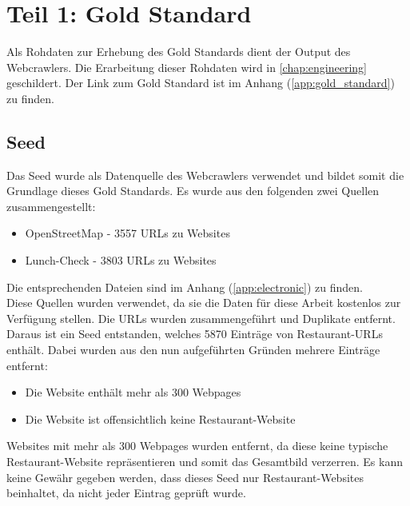 \chapter{Teil 1: Gold Standard}
\label{chap:gold_standard}
Als Rohdaten zur Erhebung des Gold Standards dient der Output des Webcrawlers.
Die Erarbeitung dieser Rohdaten wird in \cref{chap:engineering} geschildert.
Der Link zum Gold Standard ist im Anhang (\cref{app:gold_standard}) zu finden.
\section{Seed}
Das Seed wurde als Datenquelle des Webcrawlers verwendet und bildet somit die Grundlage dieses Gold Standards.
Es wurde aus den folgenden zwei Quellen zusammengestellt:
\begin{itemize}
	\item OpenStreetMap - 3557 URLs zu Websites
	\item Lunch-Check - 3803 URLs zu Websites
\end{itemize}
Die entsprechenden Dateien sind im Anhang (\cref{app:electronic}) zu finden.\\
Diese Quellen wurden verwendet, da sie die Daten für diese Arbeit kostenlos zur Verfügung stellen.
Die URLs wurden zusammengeführt und Duplikate entfernt.
Daraus ist ein Seed entstanden, welches 5870 Einträge von Restaurant-URLs enthält.
Dabei wurden aus den nun aufgeführten Gründen mehrere Einträge entfernt:
\begin{itemize}
	\item Die Website enthält mehr als 300 Webpages
	\item Die Website ist offensichtlich keine Restaurant-Website
\end{itemize}
Websites mit mehr als 300 Webpages wurden entfernt, da diese keine typische Restaurant-Website repräsentieren und somit das Gesamtbild verzerren.
Es kann keine Gewähr gegeben werden, dass dieses Seed nur Restaurant-Websites beinhaltet, da nicht jeder Eintrag geprüft wurde.
